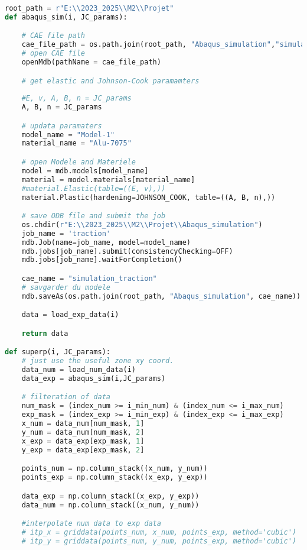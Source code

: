 \documentclass[12pt,a4paper]{article}
\begin{document}
\begin{lstlisting}[language=Python, caption={Optimisation superposition}]
root_path = r"E:\\2023_2025\\M2\\Projet"
def abaqus_sim(i, JC_params):

    # CAE file path
    cae_file_path = os.path.join(root_path, "Abaqus_simulation","simulation_traction.cae")
    # open CAE file
    openMdb(pathName = cae_file_path)

    # get elastic and Johnson-Cook paramamters
  
    #E, v, A, B, n = JC_params
    A, B, n = JC_params

    # updata paramaters
    model_name = "Model-1"  
    material_name = "Alu-7075"  

    # open Modele and Materiele
    model = mdb.models[model_name]
    material = model.materials[material_name]
    #material.Elastic(table=((E, v),))
    material.Plastic(hardening=JOHNSON_COOK, table=((A, B, n),))

    # save ODB file and submit the job
    os.chdir(r"E:\\2023_2025\\M2\\Projet\\Abaqus_simulation")
    job_name = 'traction'
    mdb.Job(name=job_name, model=model_name)
    mdb.jobs[job_name].submit(consistencyChecking=OFF)
    mdb.jobs[job_name].waitForCompletion()

    cae_name = "simulation_traction"
    # savgarder du modele
    mdb.saveAs(os.path.join(root_path, "Abaqus_simulation", cae_name))

    data = load_exp_data(i)

    return data

def superp(i, JC_params):
    # just use the useful zone xy coord. 
    data_num = load_num_data(i)
    data_exp = abaqus_sim(i,JC_params)

    # filteration of data
    num_mask = (index_num >= i_min_num) & (index_num <= i_max_num)
    exp_mask = (index_exp >= i_min_exp) & (index_exp <= i_max_exp)
    x_num = data_num[num_mask, 1]
    y_num = data_num[num_mask, 2]
    x_exp = data_exp[exp_mask, 1]
    y_exp = data_exp[exp_mask, 2]

    points_num = np.column_stack((x_num, y_num))  
    points_exp = np.column_stack((x_exp, y_exp)) 

    data_exp = np.column_stack((x_exp, y_exp))
    data_num = np.column_stack((x_num, y_num))

    #interpolate num data to exp data
    # itp_x = griddata(points_num, x_num, points_exp, method='cubic')
    # itp_y = griddata(points_num, y_num, points_exp, method='cubic')


\end{lstlisting}
\end{document}
